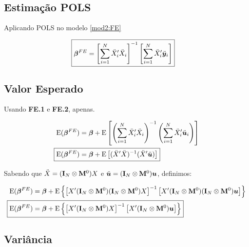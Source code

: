 \documentclass[11pt, oneside, a4paper, article]{article}
\numberwithin{equation}{section}
\begin{document}
\subsection{Estimação POLS}

Aplicando POLS no modelo \eqref{mod2:FE}

\vspace{-1 em}
\begin{align} \label{beta:pols:FE}
\Aboxed{
\betavec^{FE} =
\left[ \sum_{i=1}^{N} \ddot{X}_{i}' \ddot{X}_{i} \right]^{-1}
\left[ \sum_{i=1}^{N} \ddot{X}_{i}' \ddot{\yvec}_{i} \right]
}
\end{align}

\subsection{Valor Esperado}
Usando \textbf{FE.1} e \textbf{FE.2}, apenas.

\vspace{-1 em}
\begin{align*}
\E( \betavec^{FE} ) &=
\betavec +
\E\left[
\left( \sum_{i=1}^{N} \ddot{X}_{i}' \ddot{X}_{i} \right)^{-1}
\left( \sum_{i=1}^{N} \ddot{X}_{i}' \ddot{\uvec}_{i} \right)
\right]
\\
\Aboxed{
\E( \betavec^{FE} ) &=
\betavec +
\E \left[ ( \ddot{X}' \ddot{X} )^{-1} (\ddot{X}' \ddot{\uvec}) \right]
}
\end{align*}

\noindent
Sabendo que 
$\ddot{X} = ( \mathbf{I}_{N} \otimes \mathbf{M}^{0} ) X$
e
$\ddot{\boldsymbol{u}} = ( \mathbf{I}_{N} \otimes \mathbf{M}^{0} ) \boldsymbol{u}$,
definimos:

\vspace{-1 em}
\begin{align*}
\E( \betavec^{FE} ) &=
\betavec +
\E \left\{
\left[  
X' ( \Imat_{N} \otimes \Mzero )( \Imat_{N} \otimes \Mzero ) X 
\right]^{-1}
\left[ 
X' ( \Imat_{N} \otimes \Mzero )( \Imat_{N} \otimes \Mzero ) \uvec
\right]
\right\}
\\
\Aboxed{
\E( \betavec^{FE} ) &=
\betavec +
\E \left\{
\left[  
X' ( \Imat_{N} \otimes \Mzero ) X 
\right]^{-1}
\left[ 
X' ( \Imat_{N} \otimes \Mzero ) \uvec
\right]
\right\} }
\end{align*}

\subsection{Variância}
\end{document}
